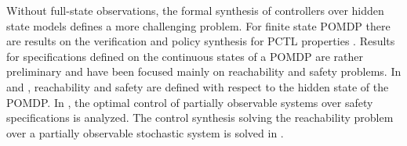 \documentclass{ifacconf}
\newcommand{\red}[1]{{\color{red} #1}}
\renewcommand{\axx}[1]{{\color{orange} Ali: #1}}
\begin{document}
 
Without full-state observations, the formal synthesis of controllers over hidden state models
defines a more challenging problem.
 For finite state POMDP there are results on the verification and policy synthesis  for PCTL properties \citep{Norman2017, Chatterjee2014}.
%
Results for specifications defined on the continuous states of a POMDP are rather preliminary and have been focused mainly on reachability and safety problems. 
In  \citep{ding2013optimal} and \citep{LESSER20141989}, reachability and safety  are defined with respect to the hidden state of the POMDP.
%
In \citep{ding2013optimal}, the optimal control of partially observable systems over safety specifications is analyzed.  The control synthesis solving the reachability problem over a  partially observable stochastic system is solved
in \citep{LESSER20141989}. %

 
\end{document}
